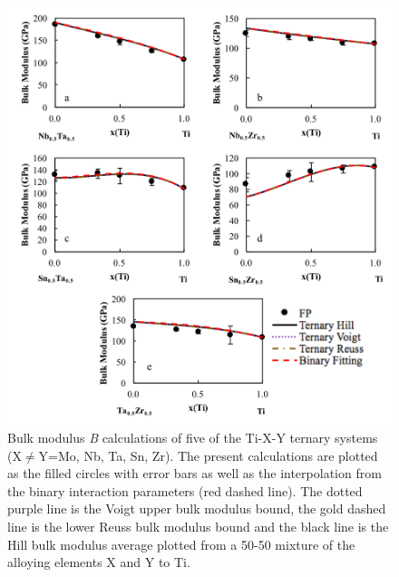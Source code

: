 \pagebreak
\begin{figure}[H]
	\centering
	\includegraphics[width=\textwidth]{Chapter-6/Figures/tixybulk2.png}
	\caption{Bulk modulus \textit{B} calculations of five of the Ti-X-Y ternary systems (X$\neq$Y=Mo, Nb, Ta, Sn, Zr). The present calculations are plotted as the filled circles with error bars as well as the interpolation from the binary interaction parameters (red dashed line). The dotted purple line is the Voigt upper bulk modulus bound, the gold dashed line is the lower Reuss bulk modulus bound and the black line is the Hill bulk modulus average plotted from a 50-50 mixture of the alloying elements X and Y to Ti.}
	\label{Ch6-figure:tixybulk2}
\end{figure}

